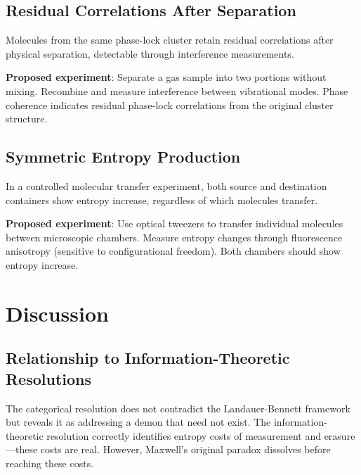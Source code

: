 \documentclass[twocolumn,showpacs,preprintnumbers,amsmath,amssymb,prd]{revtex4-2}
\theoremstyle{definition}
\theoremstyle{remark}
\begin{document}
\subsection{Residual Correlations After Separation}

\begin{prediction}
Molecules from the same phase-lock cluster retain residual correlations after physical separation, detectable through interference measurements.
\end{prediction}

\textbf{Proposed experiment}: Separate a gas sample into two portions without mixing. Recombine and measure interference between vibrational modes. Phase coherence indicates residual phase-lock correlations from the original cluster structure.

\subsection{Symmetric Entropy Production}

\begin{prediction}
In a controlled molecular transfer experiment, both source and destination containers show entropy increase, regardless of which molecules transfer.
\end{prediction}

\textbf{Proposed experiment}: Use optical tweezers to transfer individual molecules between microscopic chambers. Measure entropy changes through fluorescence anisotropy (sensitive to configurational freedom). Both chambers should show entropy increase.

\section{Discussion}
\label{sec:discussion}

\subsection{Relationship to Information-Theoretic Resolutions}

The categorical resolution does not contradict the Landauer-Bennett framework but reveals it as addressing a demon that need not exist. The information-theoretic resolution correctly identifies entropy costs of measurement and erasure---these costs are real. However, Maxwell's original paradox dissolves before reaching these costs.
\end{document}

